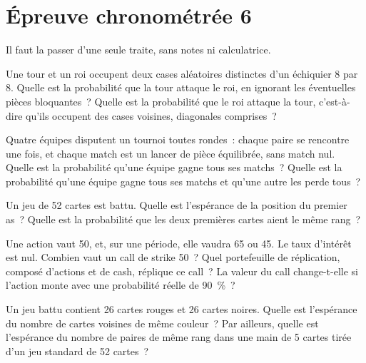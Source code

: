 \chapter{Épreuve chronométrée 6}\label{ch:iv1:timed-test-6}

\begin{ivtrains}
Il faut la passer d'une seule traite, sans notes ni calculatrice.
\end{ivtrains}


\begin{question}\label{iq:iv1:timed-test-6:1}
Une tour et un roi occupent deux cases aléatoires distinctes d'un échiquier 8 par 8. Quelle est la probabilité que la tour attaque le roi, en ignorant les éventuelles pièces bloquantes~? Quelle est la probabilité que le roi attaque la tour, c'est-à-dire qu'ils occupent des cases voisines, diagonales comprises~?
\end{question}

\begin{question}\label{iq:iv1:timed-test-6:2}
Quatre équipes disputent un tournoi toutes rondes~: chaque paire se rencontre une fois, et chaque match est un lancer de pièce équilibrée, sans match nul. Quelle est la probabilité qu'une équipe gagne tous ses matchs~? Quelle est la probabilité qu'une équipe gagne tous ses matchs et qu'une autre les perde tous~?
\end{question}

\begin{question}\label{iq:iv1:timed-test-6:3}
Un jeu de 52 cartes est battu. Quelle est l'espérance de la position du premier as~? Quelle est la probabilité que les deux premières cartes aient le même rang~?
\end{question}

\begin{question}\label{iq:iv1:timed-test-6:4}
Une action vaut 50, et, sur une période, elle vaudra 65 ou 45. Le taux d'intérêt est nul. Combien vaut un call de strike 50~? Quel portefeuille de réplication, composé d'actions et de cash, réplique ce call~? La valeur du call change-t-elle si l'action monte avec une probabilité réelle de 90~\%~?
\end{question}

\begin{question}\label{iq:iv1:timed-test-6:5}
Un jeu battu contient 26 cartes rouges et 26 cartes noires. Quelle est l'espérance du nombre de cartes voisines de même couleur~? Par ailleurs, quelle est l'espérance du nombre de paires de même rang dans une main de 5 cartes tirée d'un jeu standard de 52 cartes~?
\end{question}

